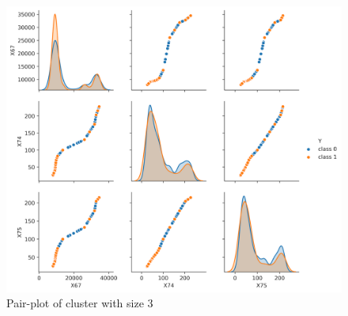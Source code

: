 \documentclass[twoside,11pt]{article}
\begin{document}
\begin{figure}
    \centering
    \includegraphics[scale = 0.4]{Figures/Empirical/cluster size3.png}
    \caption{Pair-plot of cluster with size 3}
    \label{cluster_size3}
\end{figure}
\end{document}
